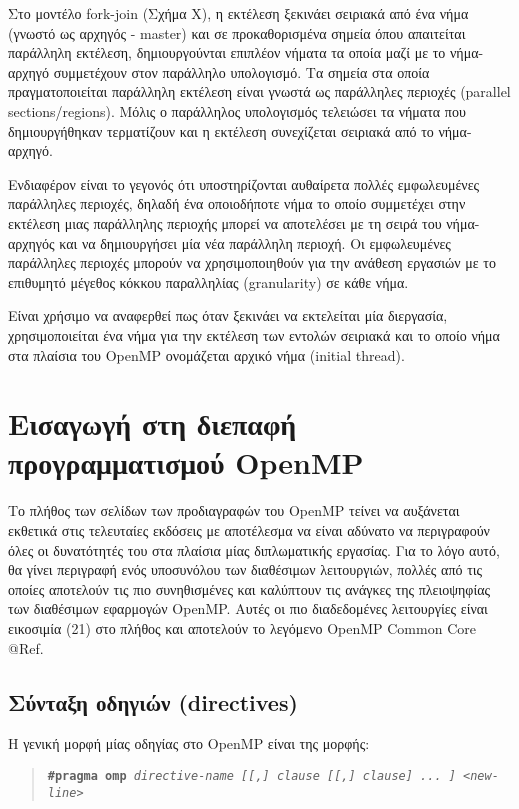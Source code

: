 Στο μοντέλο fork-join (Σχήμα Χ), η εκτέλεση ξεκινάει σειριακά από ένα νήμα (γνωστό ως αρχηγός - master) και σε προκαθορισμένα σημεία όπου απαιτείται παράλληλη εκτέλεση, δημιουργούνται επιπλέον νήματα τα οποία μαζί με το νήμα-αρχηγό συμμετέχουν στον παράλληλο υπολογισμό. Τα σημεία στα οποία πραγματοποιείται παράλληλη εκτέλεση είναι γνωστά ως παράλληλες περιοχές (parallel sections/regions). Μόλις ο παράλληλος υπολογισμός τελειώσει τα νήματα που δημιουργήθηκαν τερματίζουν και η εκτέλεση συνεχίζεται σειριακά από το νήμα-αρχηγό.

Ενδιαφέρον είναι το γεγονός ότι υποστηρίζονται αυθαίρετα πολλές εμφωλευμένες παράλληλες περιοχές, δηλαδή ένα οποιοδήποτε νήμα το οποίο συμμετέχει στην εκτέλεση μιας παράλληλης περιοχής μπορεί να αποτελέσει με τη σειρά του νήμα-αρχηγός και να δημιουργήσει μία νέα παράλληλη περιοχή. Οι εμφωλευμένες παράλληλες περιοχές μπορούν να χρησιμοποιηθούν για την ανάθεση εργασιών με το επιθυμητό μέγεθος κόκκου παραλληλίας (granularity) σε κάθε νήμα.

Είναι χρήσιμο να αναφερθεί πως όταν ξεκινάει να εκτελείται μία διεργασία, χρησιμοποιείται ένα νήμα για την εκτέλεση των εντολών σειριακά και το οποίο νήμα στα πλαίσια του OpenMP ονομάζεται αρχικό νήμα (initial thread).

\section{Εισαγωγή στη διεπαφή προγραμματισμού OpenMP}

Το πλήθος των σελίδων των προδιαγραφών του OpenMP τείνει να αυξάνεται εκθετικά στις τελευταίες εκδόσεις με αποτέλεσμα να είναι αδύνατο να περιγραφούν όλες οι δυνατότητές του στα πλαίσια μίας διπλωματικής εργασίας. Για το λόγο αυτό, θα γίνει περιγραφή ενός υποσυνόλου των διαθέσιμων λειτουργιών, πολλές από τις οποίες αποτελούν τις πιο συνηθισμένες και καλύπτουν τις ανάγκες της πλειοψηφίας των διαθέσιμων εφαρμογών OpenMP. Αυτές οι πιο διαδεδομένες λειτουργίες είναι εικοσιμία (21) στο πλήθος και αποτελούν το λεγόμενο OpenMP Common Core @Ref.

\subsection{Σύνταξη οδηγιών (directives)}
Η γενική μορφή μίας οδηγίας στο OpenMP είναι της μορφής:

\begin{quote}
	\texttt{\textbf{\#pragma omp} \textit{directive-name [[,] clause [[,] clause] ... ] <new-line>}}
\end{quote}

